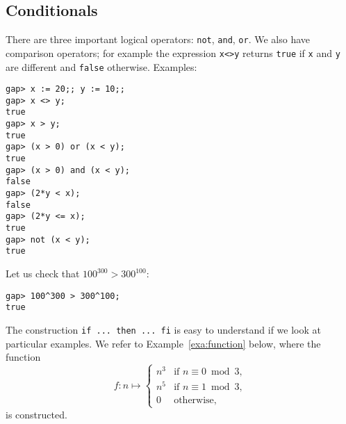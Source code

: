 \subsection{Conditionals}

There are three important logical operators: \lstinline{not}, \lstinline{and},
\lstinline{or}.  We also have comparison operators; for example the expression
\lstinline{x<>y} returns \lstinline{true} if \lstinline{x} and \lstinline{y}
are different and \lstinline{false} otherwise.  Examples:
\begin{lstlisting}
gap> x := 20;; y := 10;;
gap> x <> y;
true
gap> x > y;
true
gap> (x > 0) or (x < y);
true
gap> (x > 0) and (x < y);
false
gap> (2*y < x);
false
gap> (2*y <= x);
true
gap> not (x < y);
true	
\end{lstlisting}

\begin{example}
	Let us check that $100^{300}>300^{100}$:
\begin{lstlisting}
gap> 100^300 > 300^100;
true
\end{lstlisting}
\end{example}

The construction \lstinline{if ... then ... fi} is easy to understand 
if we look at particular examples. We 
refer to Example~\ref{exa:function} below, where
the function
\[
f\colon n\mapsto\begin{cases}
	n^3 & \text{if $n\equiv0\bmod 3$},\\
	n^5 & \text{if $n\equiv1\bmod 3$},\\
	0 & \text{otherwise},
\end{cases}
\]
is constructed. 



